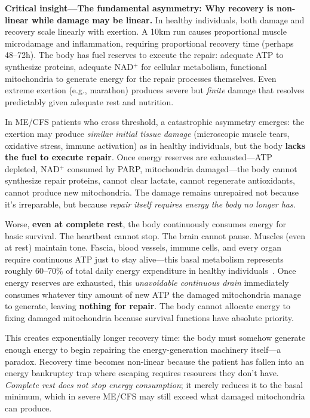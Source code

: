 \textbf{Critical insight---The fundamental asymmetry: Why recovery is non-linear while damage may be linear.} In healthy individuals, both damage and recovery scale linearly with exertion. A 10km run causes proportional muscle microdamage and inflammation, requiring proportional recovery time (perhaps 48--72h). The body has fuel reserves to execute the repair: adequate ATP to synthesize proteins, adequate NAD$^+$ for cellular metabolism, functional mitochondria to generate energy for the repair processes themselves. Even extreme exertion (e.g., marathon) produces severe but \textit{finite} damage that resolves predictably given adequate rest and nutrition.

In ME/CFS patients who cross threshold, a catastrophic asymmetry emerges: the exertion may produce \textit{similar initial tissue damage} (microscopic muscle tears, oxidative stress, immune activation) as in healthy individuals, but the body \textbf{lacks the fuel to execute repair}. Once energy reserves are exhausted---ATP depleted, NAD$^+$ consumed by PARP, mitochondria damaged---the body cannot synthesize repair proteins, cannot clear lactate, cannot regenerate antioxidants, cannot produce new mitochondria. The damage remains unrepaired not because it's irreparable, but because \textit{repair itself requires energy the body no longer has}.

Worse, \textbf{even at complete rest}, the body continuously consumes energy for basic survival. The heartbeat cannot stop. The brain cannot pause. Muscles (even at rest) maintain tone. Fascia, blood vessels, immune cells, and every organ require continuous ATP just to stay alive---this basal metabolism represents roughly 60--70\% of total daily energy expenditure in healthy individuals~\cite{pontzer2021constrained}. Once energy reserves are exhausted, this \textit{unavoidable continuous drain} immediately consumes whatever tiny amount of new ATP the damaged mitochondria manage to generate, leaving \textbf{nothing for repair}. The body cannot allocate energy to fixing damaged mitochondria because survival functions have absolute priority.

This creates exponentially longer recovery time: the body must somehow generate enough energy to begin repairing the energy-generation machinery itself---a paradox. Recovery time becomes non-linear because the patient has fallen into an energy bankruptcy trap where escaping requires resources they don't have. \textit{Complete rest does not stop energy consumption}; it merely reduces it to the basal minimum, which in severe ME/CFS may still exceed what damaged mitochondria can produce.

